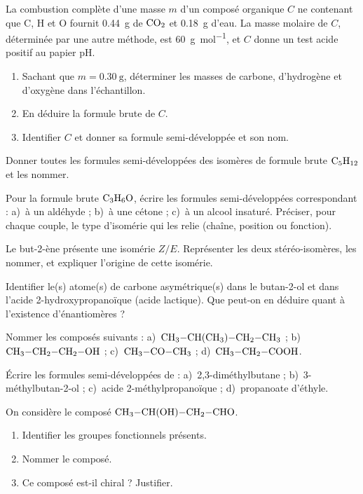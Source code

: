 \exo{} La combustion complète d'une masse $m$ d'un composé organique $C$ ne
contenant que C, H et O fournit \SI{0.44}{\gram} de $\ce{CO2}$ et \SI{0.18}{\gram}
d'eau. La masse molaire de $C$, déterminée par une autre méthode, est
\SI{60}{\gram\per\mol}, et $C$ donne un test acide positif au papier pH.
\begin{enumerate}[label=\arabic*)]
\item Sachant que $m = \SI{0.30}{\gram}$, déterminer les masses de carbone,
d'hydrogène et d'oxygène dans l'échantillon.
\item En déduire la formule brute de $C$.
\item Identifier $C$ et donner sa formule semi-développée et son nom.
\end{enumerate}


\exo{} Donner toutes les formules semi-développées des isomères de formule
brute $\ce{C5H12}$ et les nommer.

\exo{} Pour la formule brute $\ce{C3H6O}$, écrire les formules
semi-développées correspondant : a)~à un aldéhyde ; b)~à une cétone ; c)~à un alcool
insaturé. Préciser, pour chaque couple, le type d'isomérie qui les relie (chaîne,
position ou fonction).

\exo{} Le but-2-ène présente une isomérie $Z/E$. Représenter les deux
stéréo-isomères, les nommer, et expliquer l'origine de cette isomérie.

\exo{} Identifier le(s) atome(s) de carbone asymétrique(s) dans le
butan-2-ol et dans l'acide 2-hydroxypropanoïque (acide lactique). Que peut-on en
déduire quant à l'existence d'énantiomères ?


\exo{} Nommer les composés suivants : a)~$\ce{CH3-CH(CH3)-CH2-CH3}$ ;
b)~$\ce{CH3-CH2-CH2-OH}$ ; c)~$\ce{CH3-CO-CH3}$ ; d)~$\ce{CH3-CH2-COOH}$.

\exo{} Écrire les formules semi-développées de : a)~2,3-diméthylbutane ;
b)~3-méthylbutan-2-ol ; c)~acide 2-méthylpropanoïque ; d)~propanoate d'éthyle.

\exo{} On considère le composé $\ce{CH3-CH(OH)-CH2-CHO}$.
\begin{enumerate}[label=\arabic*)]
\item Identifier les groupes fonctionnels présents.
\item Nommer le composé.
\item Ce composé est-il chiral ? Justifier.
\end{enumerate}

